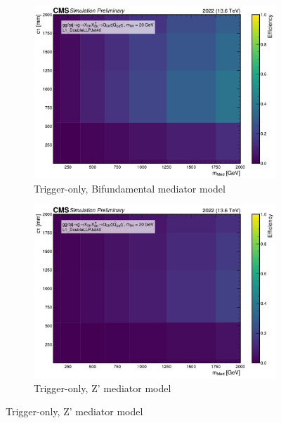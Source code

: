 \begin{figure}[h]
  \centering

  \begin{subfigure}[t]{0.45\textwidth}
    \centering
    \includegraphics[width=\linewidth]{images/L1/llp_2D_tchan/trigeffplots2D_L1_efftype-trig_t-channel_mDark-20_L1_DoubleLLPJet40_study_cloppear.pdf}
    \caption{Trigger-only, Bifundamental mediator model}
    \label{fig:doublellp_trig_tchan}
  \end{subfigure}
  \hfill
  \begin{subfigure}[t]{0.45\textwidth}
    \centering
    \includegraphics[width=\linewidth]{images/L1/llp_2D_schan/trigeffplots2D_L1_efftype-trig_s-channel_mDark-20_L1_DoubleLLPJet40_study_cloppear.pdf}
    \caption{Trigger-only, Z' mediator model}
    \label{fig:doublellp_trig_schan}
  \end{subfigure}


\end{figure}
